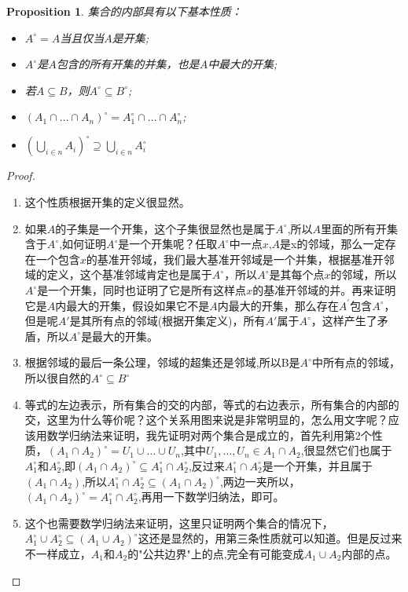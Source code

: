 \documentclass{article}
\newtheorem{proposition}[theorem]{Proposition}
\begin{document}
\begin{proposition}
集合的内部具有以下基本性质：
\begin{itemize}
	\item $A^{\circ}=A$当且仅当$A$是开集;
	\item $A^{\circ}$是$A$包含的所有开集的并集，也是$A$中最大的开集;
	\item 若$A \subseteq B$，则$A^{\circ} \subseteq B^{\circ}$;
	\item $(A_1 \cap \ldots \cap A_n)^{\circ}=A_1^{\circ} \cap \ldots \cap A_n^{\circ}$;
	\item ${\left(\bigcup\limits_{i \in n} A_i\right)}^{\circ} \supseteq \bigcup\limits_{i \in n} A_i^{\circ}$
\end{itemize}
\end{proposition}
\begin{proof}
\begin{enumerate}
	\item 这个性质根据开集的定义很显然。
	\item 如果$A$的子集是一个开集，这个子集很显然也是属于$A^{\circ}$,所以$A$里面的所有开集含于$A^{\circ}$,如何证明$A^{\circ}$是一个开集呢？任取$A^{\circ}$中一点$x$,$A$是x的邻域，那么一定存在一个包含$x$的基准开邻域，我们最大基准开邻域是一个并集，根据基准开邻域的定义，这个基准邻域肯定也是属于$A^{\circ}$，所以$A^{\circ}$是其每个点$x$的邻域，所以$A^{\circ}$是一个开集，同时也证明了它是所有这样点$x$的基准开邻域的并。再来证明它是$A$内最大的开集，假设如果它不是$A$内最大的开集，那么存在$A^{'}$包含$A^{\circ}$，但是呢$A'$是其所有点的邻域(根据开集定义)，所有$A'$属于$A^{\circ}$，这样产生了矛盾，所以$A^{\circ}$是最大的开集。
	\item 根据邻域的最后一条公理，邻域的超集还是邻域,所以B是$A^{\circ}$中所有点的邻域，所以很自然的$A^{\circ} \subseteq B^{\circ}$
	\item 等式的左边表示，所有集合的交的内部，等式的右边表示，所有集合的内部的交，这里为什么等价呢？这个关系用图来说是非常明显的，怎么用文字呢？应该用数学归纳法来证明，我先证明对两个集合是成立的，首先利用第2个性质，${(A_1 \cap A_2)}^{\circ}=U_1 \cup \ldots \cup U_n $,其中$U_1,\ldots,U_n \in A_1 \cap A_2$,很显然它们也属于$A_1^{\circ}$和$A_2^{\circ}$,即${(A_1 \cap A_2)}^{\circ} \subseteq A_1^{\circ} \cap A_2^{\circ}$,反过来$A_1^{\circ} \cap A_2^{\circ}$是一个开集，并且属于$(A_1 \cap A_2)$,所以$A_1^{\circ} \cap A_2^{\circ} \subseteq {(A_1 \cap A_2)}^{\circ}$,两边一夹所以，${(A_1 \cap A_2)}^{\circ} = A_1^{\circ} \cap A_2^{\circ}$,再用一下数学归纳法，即可。
	\item 这个也需要数学归纳法来证明，这里只证明两个集合的情况下，$A_1^{\circ} \cup A_2^{\circ} \subseteq {(A_1 \cup A_2)}^{\circ}$这还是显然的，用第三条性质就可以知道。但是反过来不一样成立，$A_1$和$A_2$的"公共边界"上的点,完全有可能变成$A_1 \cup A_2$内部的点。

\end{enumerate}
\end{proof}
\end{document}
